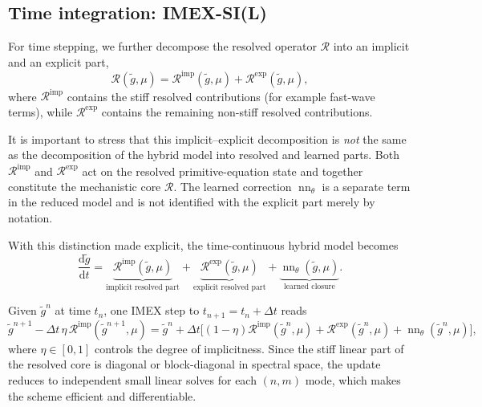 \subsection{Time integration: IMEX-SI(L)}
For time stepping, we further decompose the resolved operator $\mathcal{R}$ into an implicit and an explicit part,
\begin{equation}
  \mathcal{R}(\widetilde{g},\mu)
  =
  \mathcal{R}^{\mathrm{imp}}(\widetilde{g},\mu)
  +
  \mathcal{R}^{\mathrm{exp}}(\widetilde{g},\mu),
\end{equation}
where $\mathcal{R}^{\mathrm{imp}}$ contains the stiff resolved contributions (for example fast-wave terms), while $\mathcal{R}^{\mathrm{exp}}$ contains the remaining non-stiff resolved contributions.

It is important to stress that this implicit--explicit decomposition is \emph{not} the same as the decomposition of the hybrid model into resolved and learned parts. Both $\mathcal{R}^{\mathrm{imp}}$ and $\mathcal{R}^{\mathrm{exp}}$ act on the resolved primitive-equation state and together constitute the mechanistic core $\mathcal{R}$. The learned correction $\operatorname{nn}_\theta$ is a separate term in the reduced model and is not identified with the explicit part merely by notation.

With this distinction made explicit, the time-continuous hybrid model becomes
\begin{equation}
  \frac{\mathrm{d}\widetilde{g}}{\mathrm{d}t}
  =
  \underbrace{\mathcal{R}^{\mathrm{imp}}(\widetilde{g},\mu)}_{\text{implicit resolved part}}
  +
  \underbrace{\mathcal{R}^{\mathrm{exp}}(\widetilde{g},\mu)}_{\text{explicit resolved part}}
  +
  \underbrace{\operatorname{nn}_\theta(\widetilde{g},\mu)}_{\text{learned closure}}.
\end{equation}

Given $\widetilde{g}^n$ at time $t_n$, one IMEX step to $t_{n+1}=t_n+\Delta t$ reads
\begin{equation}
  \widetilde{g}^{n+1}
  -
  \Delta t\,\eta\,\mathcal{R}^{\mathrm{imp}}(\widetilde{g}^{n+1},\mu)
  =
  \widetilde{g}^n
  +
  \Delta t\Big[
    (1-\eta)\mathcal{R}^{\mathrm{imp}}(\widetilde{g}^n,\mu)
    + \mathcal{R}^{\mathrm{exp}}(\widetilde{g}^n,\mu)
    + \operatorname{nn}_\theta(\widetilde{g}^n,\mu)
  \Big],
  \label{eq:imex}
\end{equation}
where $\eta\in[0,1]$ controls the degree of implicitness. Since the stiff linear part of the resolved core is diagonal or block-diagonal in spectral space, the update reduces to independent small linear solves for each $(n,m)$ mode, which makes the scheme efficient and differentiable.


